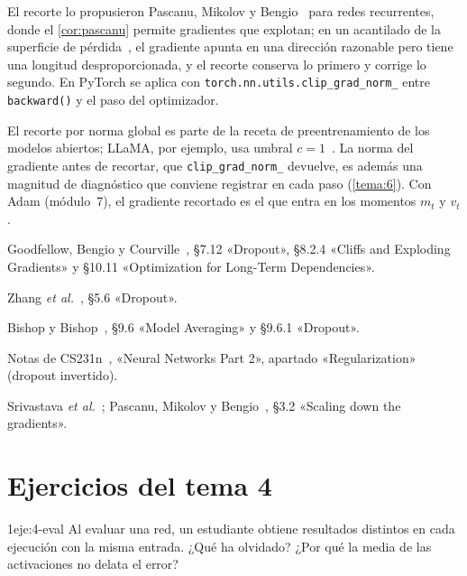 El recorte lo propusieron Pascanu, Mikolov y Bengio~\cite[§3.2]{pascanu} para redes recurrentes, donde el \cref{cor:pascanu} permite gradientes que explotan; en un acantilado de la superficie de pérdida~\cite[§8.2.4]{gbc}, el gradiente apunta en una dirección razonable pero tiene una longitud desproporcionada, y el recorte conserva lo primero y corrige lo segundo. En PyTorch se aplica con \texttt{torch.nn.utils.clip\_grad\_norm\_} entre \texttt{backward()} y el paso del optimizador.

\begin{observacion}
El recorte por norma global es parte de la receta de preentrenamiento de los modelos abiertos; LLaMA, por ejemplo, usa umbral $c=1$~\cite{llama}. La norma del gradiente antes de recortar, que \texttt{clip\_grad\_norm\_} devuelve, es además una magnitud de diagnóstico que conviene registrar en cada paso (\cref{tema:6}). Con Adam (módulo~7), el gradiente recortado es el que entra en los momentos $m_t$ y $v_t$.
\end{observacion}

\begin{lecturas}
\item Goodfellow, Bengio y Courville~\cite{gbc}, §7.12 «Dropout», §8.2.4 «Cliffs and Exploding Gradients» y §10.11 «Optimization for Long-Term Dependencies».
\item Zhang \emph{et al.}~\cite{d2l}, §5.6 «Dropout».
\item Bishop y Bishop~\cite{bishopdl}, §9.6 «Model Averaging» y §9.6.1 «Dropout».
\item Notas de CS231n~\cite{cs231n}, «Neural Networks Part 2», apartado «Regularization» (dropout invertido).
\item Srivastava \emph{et al.}~\cite{srivastava}; Pascanu, Mikolov y Bengio~\cite{pascanu}, §3.2 «Scaling down the gradients».
\end{lecturas}

\section*{Ejercicios del tema 4}

\begin{ejercicio}{1}{eje:4-eval}
Al evaluar una red, un estudiante obtiene resultados distintos en cada ejecución con la misma entrada. ¿Qué ha olvidado? ¿Por qué la media de las activaciones no delata el error?
\end{ejercicio}

